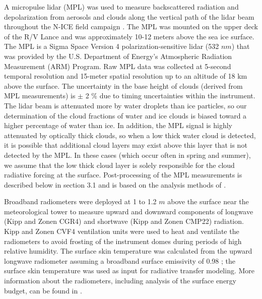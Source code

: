 A micropulse lidar (MPL) was used to measure backscattered radiation and depolarization from aerosols and clouds along the vertical path of the lidar beam throughout the N-ICE field campaign \citep{spinhirne}. The MPL was mounted on the upper deck of the R/V Lance and was approximately 10-12 meters above the sea ice surface. The MPL is a Sigma Space Version 4 polarization-sensitive lidar (532 $nm$) that was provided by the U.S. Department of Energy’s Atmospheric Radiation Measurement (ARM) Program. Raw MPL data was collected at 5-second temporal resolution and 15-meter spatial resolution up to an altitude of 18 km above the surface. The uncertainty in the base height of clouds (derived from MPL measurements) is $\pm$ 2 $\%$ due to timing uncertainties within the instrument. The lidar beam is attenuated more by water droplets than ice particles, so our determination of the cloud fractions of water and ice clouds is biased toward a higher percentage of water than ice. In addition, the MPL signal is highly attenuated by optically thick clouds, so when a low thick water cloud is detected, it is possible that additional cloud layers may exist above this layer that is not detected by the MPL. In these cases (which occur often in spring and summer), we assume that the low thick cloud layer is solely responsible for the cloud radiative forcing at the surface. Post-processing of the MPL measurements is described below in section 3.1 and is based on the analysis methods of \citet{campbell:2002, flynn:2007, stillwell:2018}.

Broadband radiometers were deployed at 1 to 1.2 $m$ above the surface near the meteorological tower to measure upward and downward components of longwave (Kipp and Zonen CGR4) and shortwave (Kipp and Zonen CMP22) radiation. Kipp and Zonen CVF4 ventilation units were used to heat and ventilate the radiometers to avoid frosting of the instrument domes during periods of high relative humidity. The surface skin temperature was calculated from the upward longwave radiometer assuming a broadband surface emissivity of 0.98 \citep{grenfell:1999}; the surface skin temperature was used as input for radiative transfer modeling. More information about the radiometers, including analysis of the surface energy budget, can be found in \citet{walden:2017}.

